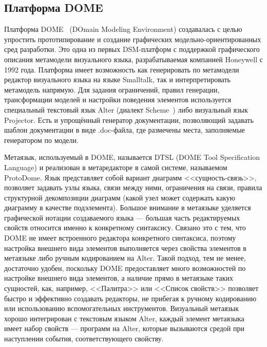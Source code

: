 \subsection{Платформа DOME}
Платформа DOME~\cite{engstrom2000building, guide1999honeywell} (DOmain Modeling Environment) создавалась с целью упростить
прототипирование и создание графических модельно-ориентированных сред разработки. Это одна из первых
\ac{DSM}-платформ с поддержкой графического описания метамодели визуального языка, разрабатываемая 
компанией Honeywell с 1992 года. Платформа имеет возможность как генерировать по метамодели редактор
визуального языка на языке Smalltalk, так и интерпретировать метамодель напрямую. Для
задания ограничений, правил генерации, трансформации моделей и настройки поведения элементов 
используется специальный текстовый язык Alter (диалект Scheme~\cite{scheme}) либо 
визуальный язык Projector. Есть и упрощённый генератор документации, позволяющий задавать шаблон документации в виде
.doc-файла, где размечены места, заполняемые генератором по модели.

Метаязык, используемый в DOME, называется DTSL (DOME Tool Specification Language) и реализован в 
метаредакторе в самой системе, называемом ProtoDome. Язык представляет собой вариант диаграмм <<сущность-связь>>, позволяет задавать узлы языка,
связи между ними, ограничения на связи, правила структурной декомпозиции диаграмм
(какой узел может содержать какую диаграмму в качестве подэлемента). Большое внимание
в метаязыке уделяется графической нотации создаваемого языка --- большая часть редактируемых свойств
относится именно к конкретному синтаксису. Связано это с тем, что DOME не имеет встроенного
редактора конкретного синтаксиса, поэтому настройка внешнего вида элементов выполняется через
свойства элементов в метаязыке либо ручным кодированием на Alter. Такой подход, тем не менее,
достаточно удобен, поскольку DOME предоставляет много возможностей по настройке внешнего вида элементов,
а наличие прямо в метаязыке таких сущностей, как, например, <<Палитра>> или <<Список свойств>> позволяет быстро
и эффективно создавать редакторы, не прибегая к ручному кодированию или использованию вспомогательных
инструментов. Визуальный метаязык хорошо интегрирован с текстовым языком Alter, каждый
элемент метаязыка имеет набор свойств --- программ на Alter, которые вызываются средой при 
наступлении события, соответствующего свойству.

